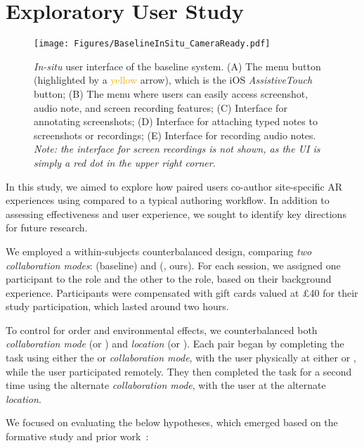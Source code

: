 \section{Exploratory User Study}\label{sec:user-study}
\begin{figure*}
    \centering
    \texttt{[image: Figures/BaselineInSitu\_CameraReady.pdf]}
    \caption{\textit{In-situ} user interface of the baseline system. \textsc{(A)} The menu button (highlighted by a \textcolor[HTML]{F1B302}{yellow} arrow), which is the iOS \textit{AssistiveTouch} button; 
    \textsc{(B)} The menu where users can easily access screenshot, audio note, and screen recording features; \textsc{(C)} Interface for annotating screenshots; \textsc{(D)} Interface for attaching typed notes to screenshots or recordings; \textsc{(E)} Interface for recording audio notes. \textit{Note: the interface for screen recordings is not shown, as the UI is simply a red dot in the upper right corner.}}
    \label{fig:insitu-baseline-system-overview}
\end{figure*}

In this study, we aimed to explore how paired users co-author site-specific AR experiences using \SystemName compared to a typical authoring workflow. In addition to assessing effectiveness and user experience, we sought to identify key directions for future research.

We employed a within-subjects counterbalanced design, comparing \textit{two collaboration modes}: \async (baseline) and \sync (\SystemName, ours). For each session, we assigned one participant to the \exsitu role and the other to the \insitu role, based on their background experience. Participants were compensated with gift cards valued at £40 for their study participation, which lasted around two hours.

To control for order and environmental effects, we counterbalanced both \textit{collaboration mode} (\sync or \async) and \textit{location} (\locA or \locB). Each pair began by completing the task using either the \sync or \async \textit{collaboration mode}, with the \insitu user physically at either \locA or \locB, while the \exsitu user participated remotely. They then completed the task for a second time using the alternate \textit{collaboration mode}, with the \insitu user at the alternate \textit{location}.

We focused on evaluating the below hypotheses, which emerged based on the formative study and prior work~\cite{guoBlocksCollaborativePersistent2019,kraussCurrentPracticesChallenges2021,walkerExperiencingFlowDoing2010,ngSituatedGameLevel2018}:

